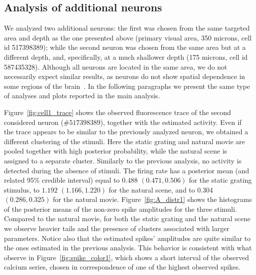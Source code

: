 \subsection{Analysis of additional neurons}
We analyzed two additional neurons: the first was chosen from the same targeted area and depth as the one presented above (primary visual area, 350 microns, cell id 517398389); while the second neuron was chosen from the same area but at a different depth, and, specifically, at a much shallower depth (175 microns, cell id 587435328). 
Although all neurons are located in the same area, we do not necessarily expect similar results, as neurons do not show spatial dependence in some regions of the brain~\parencite{rosenbaum2017}.
In the following paragraphs we present the same type of analyses and plots reported in the main analysis. 

Figure~\ref{fig:cell1_trace} shows the observed fluorescence trace of the second considered neuron ($\#517398389$), together with the estimated activity.
Even if the trace appears to be similar to the previously analyzed neuron, we obtained a different clustering of the stimuli. Here the static grating and natural movie are pooled together with high posterior probability, while the natural scene is assigned to a separate cluster. Similarly to the previous analysis, no activity is detected during the absence of stimuli.
The firing rate has a posterior mean (and related 95\% credible interval) equal to $0.488$ $(0.471, 0.506)$ for the static grating stimulus, to $1.192$ $(1.166, 1.220)$ for the natural scene, and to $0.304$ $(0.286, 0.325)$ for the natural movie.
Figure~\ref{fig:A_distr1} shows the histograms of the posterior means of the non-zero spike amplitudes for the three stimuli. Compared to the natural movie, for both the static grating and the natural scene we observe heavier tails and the presence of clusters associated with larger parameters. Notice also that the estimated spikes' amplitudes are quite similar to the ones estimated in the previous analysis.
This behavior is consistent with what observe in Figure~\ref{fig:spike_color1}, which shows a short interval of the observed calcium series, chosen in correspondence of one of the highest observed spikes. 


